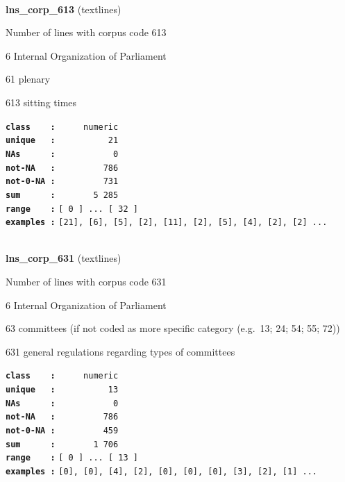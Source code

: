 \documentclass[]{article}
\begin{document}
~

\textbf{lns\_corp\_613} (textlines)

Number of lines with corpus code 613

6 Internal Organization of Parliament

61 plenary

613 sitting times

\textbf{\texttt{class\ \ \ \ :}} \texttt{~~~~~numeric}\\
\textbf{\texttt{unique\ \ \ :}} \texttt{~~~~~~~~~~21}\\
\textbf{\texttt{NAs\ \ \ \ \ \ :}} \texttt{~~~~~~~~~~~0}\\
\textbf{\texttt{not-NA\ \ \ :}} \texttt{~~~~~~~~~786}\\
\textbf{\texttt{not-0-NA\ :}} \texttt{~~~~~~~~~731}\\
\textbf{\texttt{sum\ \ \ \ \ \ :}} \texttt{~~~~~~~5~285}\\
\textbf{\texttt{range\ \ \ \ :}}
\texttt{{[}\ 0\ {]}\ ...\ {[}\ 32\ {]}}\\
\textbf{\texttt{examples\ :}}
\texttt{{[}21{]},\ {[}6{]},\ {[}5{]},\ {[}2{]},\ {[}11{]},\ {[}2{]},\ {[}5{]},\ {[}4{]},\ {[}2{]},\ {[}2{]}\ ...}\\

~

\textbf{lns\_corp\_631} (textlines)

Number of lines with corpus code 631

6 Internal Organization of Parliament

63 committees (if not coded as more specific category (e.g.~13; 24; 54;
55; 72))

631 general regulations regarding types of committees

\textbf{\texttt{class\ \ \ \ :}} \texttt{~~~~~numeric}\\
\textbf{\texttt{unique\ \ \ :}} \texttt{~~~~~~~~~~13}\\
\textbf{\texttt{NAs\ \ \ \ \ \ :}} \texttt{~~~~~~~~~~~0}\\
\textbf{\texttt{not-NA\ \ \ :}} \texttt{~~~~~~~~~786}\\
\textbf{\texttt{not-0-NA\ :}} \texttt{~~~~~~~~~459}\\
\textbf{\texttt{sum\ \ \ \ \ \ :}} \texttt{~~~~~~~1~706}\\
\textbf{\texttt{range\ \ \ \ :}}
\texttt{{[}\ 0\ {]}\ ...\ {[}\ 13\ {]}}\\
\textbf{\texttt{examples\ :}}
\texttt{{[}0{]},\ {[}0{]},\ {[}4{]},\ {[}2{]},\ {[}0{]},\ {[}0{]},\ {[}0{]},\ {[}3{]},\ {[}2{]},\ {[}1{]}\ ...}\\
\end{document}
